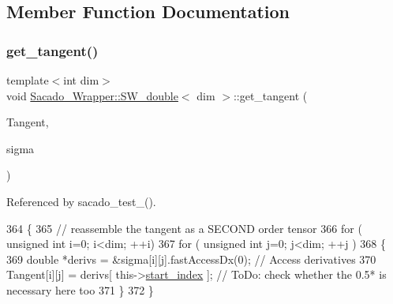 \subsection{Member Function Documentation}
\mbox{\label{classSacado__Wrapper_1_1SW__double_a2e6eca4457eb22b06172bb5749038f1e}} 
\subsubsection{\texorpdfstring{get\+\_\+tangent()}{get\_tangent()}\hspace{0.1cm}{\footnotesize\ttfamily [1/2]}}
{\footnotesize\ttfamily template$<$int dim$>$ \\
void \hyperlink{classSacado__Wrapper_1_1SW__double}{Sacado\+\_\+\+Wrapper\+::\+S\+W\+\_\+double}$<$ dim $>$\+::get\+\_\+tangent (\begin{DoxyParamCaption}\item[{Symmetric\+Tensor$<$ 2, dim $>$ \&}]{Tangent,  }\item[{Symmetric\+Tensor$<$ 2, dim, \hyperlink{Sacado__example_8cc_a868b94676739e612d9c95940e70892a9}{fad\+\_\+double} $>$ \&}]{sigma }\end{DoxyParamCaption})}



Referenced by sacado\+\_\+test\+\_().


\begin{DoxyCode}
364     \{
365         \textcolor{comment}{// reassemble the tangent as a SECOND order tensor}
366          \textcolor{keywordflow}{for} ( \textcolor{keywordtype}{unsigned} \textcolor{keywordtype}{int} i=0; i<dim; ++i)
367             \textcolor{keywordflow}{for} ( \textcolor{keywordtype}{unsigned} \textcolor{keywordtype}{int} j=0; j<dim; ++j )
368             \{
369                 \textcolor{keywordtype}{double} *derivs = &sigma[i][j].fastAccessDx(0); \textcolor{comment}{// Access derivatives}
370                 Tangent[i][j] = derivs[ this->\hyperlink{classSacado__Wrapper_1_1SW__double_aa0927ce06528899dd44afe5d770840c1}{start\_index} ]; \textcolor{comment}{// ToDo: check whether the 0.5* is
       necessary here too}
371             \}
372     \}
\end{DoxyCode}
\mbox{\label{classSacado__Wrapper_1_1SW__double_a468303caab70c91f72bfe0547afff53a}} 
